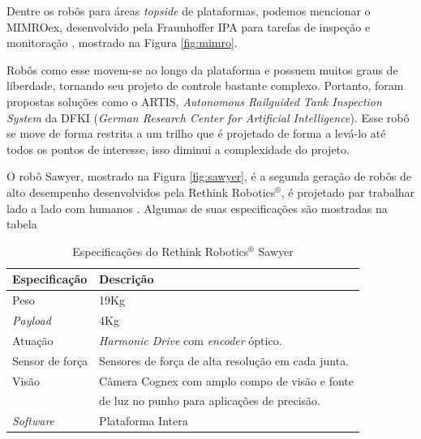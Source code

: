 Dentre os robôs para áreas \textit{topside} de plataformas, podemos mencionar o MIMROex, desenvolvido pela Fraunhoffer IPA para tarefas de inspeção e monitoração \citep{bengel2007mimroex}, mostrado na Figura \ref{fig:mimro}.

Robôs como esse movem-se ao longo da plataforma e possuem muitos graus de liberdade, tornando seu projeto de controle bastante complexo. Portanto, foram propostas soluções como o ARTIS, \textit{Autonomous Railguided Tank Inspection System} \citep{artis} da DFKI (\textit{German Research Center for Artificial Intelligence}). Esse robô se move de forma restrita a um trilho que é projetado de forma a levá-lo até todos os pontos de interesse, isso diminui a complexidade do projeto. 


O robô Sawyer\texttrademark, mostrado na Figura \ref{fig:sawyer}, é a segunda geração de robôs de alto desempenho desenvolvidos pela Rethink Robotics$^\circledR$, é projetado par trabalhar lado a lado com humanos \citep{ieee2015sawyer}. Algumas de suas especificações são mostradas na tabela 


\begin{table}[h!]
\centering
\caption{Especificações do Rethink Robotics$^\circledR$ Sawyer\texttrademark}
\label{tab:control_modes}
\begin{tabular}{ll} \hline
Especificação       & Descrição \\ \hline
Peso                & 19Kg \\
\textit{Payload}   & 4Kg  \\
Atuação            & \textit{Harmonic Drive} com \textit{encoder} óptico. \\
Sensor de força     & Sensores de força de alta resolução em cada junta. \\
Visão               & Câmera Cognex com amplo compo de visão e fonte\\
&de luz no punho para aplicações de precisão. \\
\textit{Software}  & Plataforma Intera \\
\hline
\end{tabular}
\end{table}



